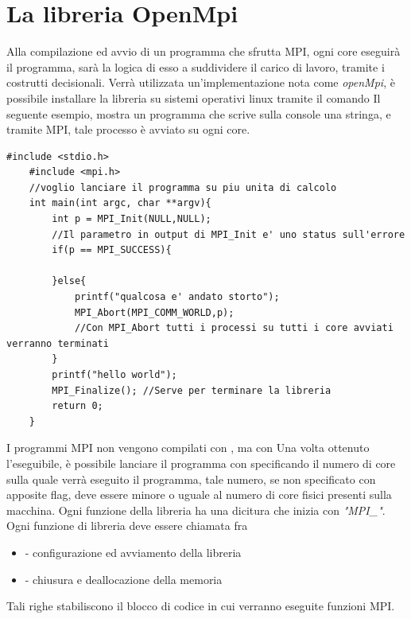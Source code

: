 \documentclass[10pt, letterpaper]{report}
\begin{document}
\section{La libreria OpenMpi}
Alla compilazione ed avvio di un programma che sfrutta MPI, ogni core eseguirà il programma, sarà la logica 
di esso a suddividere il carico di lavoro, tramite i costrutti decisionali. Verrà utilizzata un'implementazione 
nota come \textit{openMpi}, è possibile installare la libreria su sistemi operativi linux tramite il comando \acc
\acc
Il seguente esempio, mostra un programma che scrive sulla console una stringa, e tramite MPI, tale processo è avviato 
su ogni core.
\begin{lstlisting}[style=CStyle]
    #include <stdio.h>
    #include <mpi.h>
    //voglio lanciare il programma su piu unita di calcolo
    int main(int argc, char **argv){
        int p = MPI_Init(NULL,NULL); 
        //Il parametro in output di MPI_Init e' uno status sull'errore
        if(p == MPI_SUCCESS){
        
        }else{
            printf("qualcosa e' andato storto");
            MPI_Abort(MPI_COMM_WORLD,p);
            //Con MPI_Abort tutti i processi su tutti i core avviati verranno terminati 
        }
        printf("hello world");
        MPI_Finalize(); //Serve per terminare la libreria
        return 0;
    }
\end{lstlisting}
I programmi MPI non vengono compilati con , ma con \acc 
{}
\acc
Una volta ottenuto l'eseguibile, è possibile lanciare il programma con  specificando 
il numero di core sulla quale verrà eseguito il programma, tale numero, se non specificato con apposite flag, 
deve essere minore o uguale al numero di core fisici presenti sulla macchina.\acc 
{}
\acc 
Ogni funzione della libreria ha una dicitura che inizia con \textit{"MPI\_"}. Ogni funzione di libreria deve essere chiamata 
fra \begin{itemize}
    \item {} - configurazione ed avviamento della libreria 
    \item {} - chiusura e deallocazione della memoria 
\end{itemize}
Tali righe stabiliscono il blocco di codice in cui verranno eseguite funzioni MPI.
\flowerLine 
\end{document}
